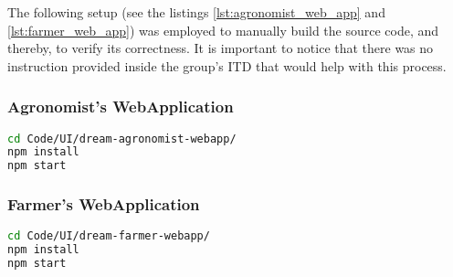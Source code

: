 The following setup (see the listings \ref{lst:agronomist_web_app} and \ref{lst:farmer_web_app}) was employed to manually build the source code, and thereby, to verify its correctness. It is important to notice that there was no instruction provided inside the group's ITD that would help with this process.

\subsubsection*{Agronomist's WebApplication}

\begin{lstlisting}[language=bash, caption={Install dependencies and build \textit{Agronomist's WebApplication}.}, label=lst:agronomist_web_app]
cd Code/UI/dream-agronomist-webapp/
npm install
npm start
\end{lstlisting}

\subsubsection*{Farmer's WebApplication}

\begin{lstlisting}[language=bash, caption={Install dependencies and build \textit{Farmer's WebApplication}.}, label=lst:farmer_web_app]
cd Code/UI/dream-farmer-webapp/
npm install
npm start
\end{lstlisting}